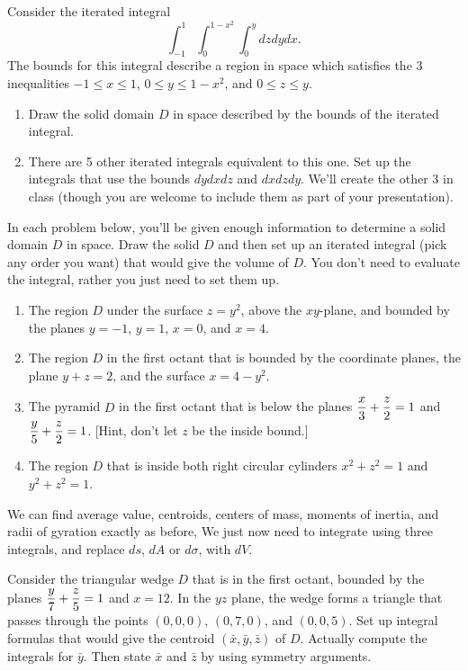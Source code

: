 \begin{problem}
Consider the iterated integral $$\int_{-1}^1\int_0^{1-x^2}\int_0^{y} dzdydx.$$
The bounds for this integral describe a region in space which satisfies the 3 inequalities $-1\leq x\leq 1$, $0\leq y\leq 1-x^2$, and $0\leq z\leq y$.
\begin{enumerate}
 \item Draw the solid domain $D$ in space described by the bounds of the iterated integral.
 \item There are 5 other iterated integrals equivalent to this one. Set up the integrals that use the bounds $dydxdz$ and $dxdzdy$.  We'll create the other 3 in class (though you are welcome to include them as part of your presentation).
\end{enumerate}
\end{problem}



\begin{problem}
 In each problem below, you'll be given enough information to determine a solid domain $D$ in space. Draw the solid $D$ and then set up an iterated integral (pick any order you want) that would give the volume of $D$.  You don't need to evaluate the integral, rather you just need to set them up.
\begin{enumerate}
 \item The region $D$ under the surface $z=y^2$, above the $xy$-plane, and bounded by the planes $y=-1$, $y=1$, $x=0$, and $x=4$.
 \item The region $D$ in the first octant that is bounded by the coordinate planes, the plane $y+z=2$, and the surface $x=4-y^2$.
 \item The pyramid $D$ in the first octant that is below the planes $\displaystyle\frac{x}{3}+\frac{z}{2}=1$ and $\displaystyle\frac{y}{5}+\frac{z}{2}=1$. [Hint, don't let $z$ be the inside bound.]
 \item The region $D$ that is inside both right circular cylinders $x^2+z^2=1$ and $y^2+z^2=1$.
\end{enumerate}
\end{problem}

We can find average value, centroids, centers of mass, moments of inertia, and radii of gyration exactly as before,  We just now need to integrate using three integrals, and replace $ds$, $dA$ or $d\sigma$, with $dV$.  
\begin{problem}
 Consider the triangular wedge $D$ that is in the first octant, bounded by the planes $\displaystyle\frac{y}{7}+\frac{z}{5}=1$ and $x=12$. In the $yz$ plane, the wedge forms a triangle that passes through the points $(0,0,0)$,  $(0,7,0)$, and $(0,0,5)$.  Set up integral formulas that would give the centroid $(\bar x,\bar y, \bar z)$ of $D$.  Actually compute the integrals for $\bar y$. Then state $\bar x$ and $\bar z$ by using symmetry arguments.
\end{problem}

